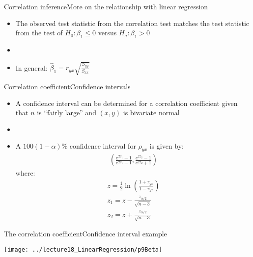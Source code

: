 \documentclass[xcolor=dvipsnames]{beamer}
\begin{document}
\begin{frame}{Correlation inference}{More on the relationship with linear regression}
	\begin{itemize}
		\item The observed test statistic from the correlation test matches the test statistic from the test of $H_0: \beta_1 \leq 0$ versus $H_a: \beta_1 >0$ \pause
		\item[]
		\item In general: $\hat{\beta}_1 = r_{yx} \sqrt{\frac{S_{yy}}{S_{xx}}}$
	\end{itemize}
\end{frame}

\begin{frame}{Correlation coefficient}{Confidence intervals}
	\begin{itemize}
		\item A confidence interval can be determined for a correlation coefficient given that $n$ is ``fairly large'' and $(x,y)$ is bivariate normal \pause
		\item[]
		\item A $100(1-\alpha)\%$ confidence interval for $\rho_{yx}$ is given by: \pause
		\begin{gather*}
		\left(\frac{e^{2 z_1}-1}{e^{2 z_1}+1}, \frac{e^{2 z_2}-1}{e^{2 z_2}+1} \right)
		\end{gather*} \pause
		where:
		\begin{gather*}
		z = \frac{1}{2} \ln \left( \frac{1+r_{yx}}{1-r_{yx}} \right) \\
		z_1 = z - \frac{z_{\alpha / 2}}{\sqrt{n-3}} \\
		z_2 = z + \frac{z_{\alpha / 2}}{\sqrt{n-3}}
		\end{gather*}
	\end{itemize}
\end{frame}

\begin{frame}{The correlation coefficient}{Confidence interval example}
	\begin{center}
		\texttt{[image: ../lecture18\_LinearRegression/p9Beta]}
	\end{center}
\end{frame}
\end{document}
